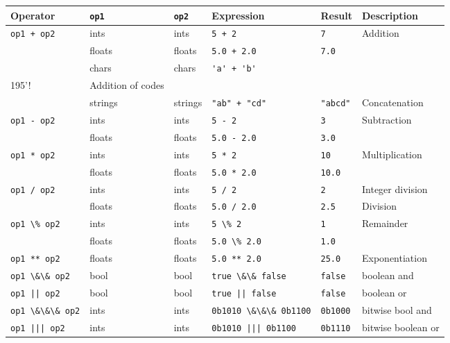 \begin{table}
  \centering
  \begin{tabularx}{\linewidth}{|l|l|l|l|l|X|}
    \hline
    Operator & \lstinline!op1! & \lstinline!op2! & Expression & Result &Description\\
    \hline
    \lstinline!op1 + op2!&ints & ints & \lstinline!5 + 2!&\lstinline!7!&Addition\\
             &floats & floats & \lstinline!5.0 + 2.0!&\lstinline!7.0!&\\
             &chars & chars & \lstinline!'a' + 'b'!&\lstinline!'\\195'!&Addition of codes\\
             &strings & strings & \lstinline!"ab" + "cd"!&\lstinline!"abcd"!&Concatenation\\
    \hline
    \lstinline!op1 - op2!&ints & ints & \lstinline!5 - 2!&\lstinline!3!&Subtraction\\
             &floats & floats & \lstinline!5.0 - 2.0!&\lstinline!3.0!&\\
    \hline
    \lstinline!op1 * op2!&ints & ints & \lstinline!5 * 2!&\lstinline!10!&Multiplication\\
             &floats & floats & \lstinline!5.0 * 2.0!&\lstinline!10.0!&\\
    \hline
    \lstinline!op1 / op2!&ints & ints & \lstinline!5 / 2!&\lstinline!2!&Integer division\\
             &floats & floats & \lstinline!5.0 / 2.0!&\lstinline!2.5!&Division\\
    \hline
    \lstinline!op1 \% op2!&ints & ints & \lstinline!5 \% 2!&\lstinline!1!&Remainder\\
             &floats & floats & \lstinline!5.0 \% 2.0!&\lstinline!1.0!&\\
    \hline
    \lstinline!op1 ** op2!&floats & floats & \lstinline!5.0 ** 2.0!&\lstinline!25.0!&Exponentiation\\
    \hline
    \lstinline!op1 \&\& op2!&bool & bool & \lstinline!true \&\& false!&\lstinline!false!&boolean and\\
    \hline
    \lstinline!op1 || op2!&bool & bool & \lstinline!true || false!&\lstinline!false!&boolean or\\
    \hline
    \lstinline!op1 \&\&\& op2!&ints & ints & \lstinline!0b1010 \&\&\& 0b1100!&\lstinline!0b1000!&bitwise bool and\\
    \hline
    \lstinline!op1 ||| op2!&ints & ints & \lstinline!0b1010 ||| 0b1100!&\lstinline!0b1110!&bitwise boolean or\\

\end{tabularx}
\end{table}
